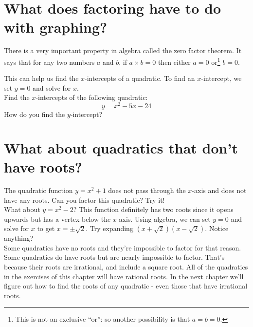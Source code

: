 \documentclass[12pt,fleqn]{book}
\begin{document}
\section*{What does factoring have to do with graphing?}
There is a very important property in algebra called the zero factor theorem.  It says that for any two numbers $a$ and $b$, if $a\times b = 0$ then either $a=0$ or\footnote{This is not an exclusive ``or'': so another possibility is that $a=b=0$.} $b=0$.

This can help us find the $x$-intercepts of a quadratic.  To find an $x$-intercept, we set $y=0$ and solve for $x$.
\\[1em]
Find the $x$-intercepts of the following quadratic:
\[y=x^2-5x-24\]
\vfill How do you find the $y$-intercept?
\\[1in]
\clearpage
\section*{What about quadratics that don't have roots?}
The quadratic function $y=x^2+1$ does not pass through the $x$-axis and does not have any roots.  Can you factor this quadratic?  Try it!
\\[4em]
What about $y=x^2 - 2$?  This function definitely has two roots since it opens upwards but has a vertex below the $x$ axis.  Using algebra, we can set $y=0$ and solve for $x$ to get $x=\pm \sqrt 2$.  Try expanding $(x+\sqrt 2)(x-\sqrt 2)$.  Notice anything?
\\[4em]
Some quadratics have no roots and they're impossible to factor for that reason.  Some quadratics do have roots but are nearly impossible to factor.  That's because their roots are irrational, and include a square root.  All of the quadratics in the exercises of this chapter will have rational roots.  In the next chapter we'll figure out how to find the roots of any quadratic - even those that have irrational roots.
\end{document}

